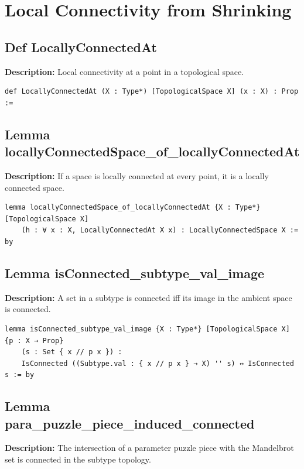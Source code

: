 \section{Local Connectivity from Shrinking}

\subsection*{Def LocallyConnectedAt}
\textbf{Description:} Local connectivity at a point in a topological space.

\begin{lstlisting}[language=Lean]
def LocallyConnectedAt (X : Type*) [TopologicalSpace X] (x : X) : Prop :=
\end{lstlisting}

\subsection*{Lemma locallyConnectedSpace\_of\_locallyConnectedAt}
\textbf{Description:} If a space is locally connected at every point, it is a locally connected space.

\begin{lstlisting}[language=Lean]
lemma locallyConnectedSpace_of_locallyConnectedAt {X : Type*} [TopologicalSpace X]
    (h : ∀ x : X, LocallyConnectedAt X x) : LocallyConnectedSpace X := by
\end{lstlisting}

\subsection*{Lemma isConnected\_subtype\_val\_image}
\textbf{Description:} A set in a subtype is connected iff its image in the ambient space is connected.

\begin{lstlisting}[language=Lean]
lemma isConnected_subtype_val_image {X : Type*} [TopologicalSpace X] {p : X → Prop}
    (s : Set { x // p x }) :
    IsConnected ((Subtype.val : { x // p x } → X) '' s) ↔ IsConnected s := by
\end{lstlisting}

\subsection*{Lemma para\_puzzle\_piece\_induced\_connected}
\textbf{Description:} The intersection of a parameter puzzle piece with the Mandelbrot set is connected in the subtype topology.

